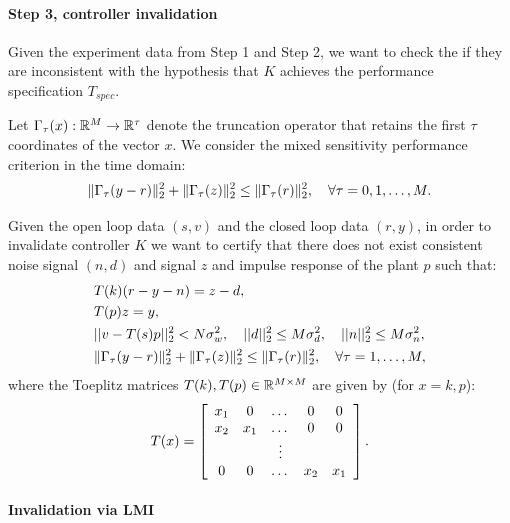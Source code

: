 \documentclass[11pt, onecolumn]{article}
\begin{document}
\paragraph{Step 3, controller invalidation}
Given the experiment data from Step 1 and Step 2, we want to check the if they are inconsistent with
the hypothesis that $K$ achieves the performance specification $T_{spec}$.

Let $\Gamma_{\tau}(x):\mathbb R^{M}\to \mathbb R^{\tau}$ denote the truncation operator that retains the first $\tau$
coordinates of the vector $x$. We consider the mixed sensitivity performance criterion in the time
domain:
\begin{align*}
  \|\Gamma_{\tau}(y-r)\|_2^2 + \|\Gamma_{\tau}(z)\|_2^2 \le \|\Gamma_{\tau}(r)\|_2^2, \quad \forall \tau = 0,1,\dots, M.
\end{align*}

Given the open loop data $(s,v)$ and the closed loop data $(r,y)$, in order to  invalidate controller
$K$ we want to certify that there does not exist consistent noise signal $(n,d)$ and signal $z$ and
impulse response of the plant $p$ such that:
\begin{align}
  & T(k) (r-y - n) = z-d,
  \label{eq:linear-k}
  \\
  & T(p) z = y,
  \label{eq:quad-p}
  \\
  & ||v - T(s)p||_2^2 < N \sigma_w^2, \quad ||d||_2^2\leq M \sigma_d^2 , \quad ||n||_2^2\leq M
  \sigma_n^2,
  \label{eq:noise-bound}
  \\
  & \|\Gamma_{\tau}(y-r)\|_2^2 + \|\Gamma_{\tau}(z)\|_2^2 \le \|\Gamma_{\tau}(r)\|_2^2, \quad \forall
  \tau = 1,\dots, M,
  \label{eq:perf-spec}
\end{align}
where the Toeplitz matrices $T(k), T(p)\in\mathbb R^{M\times M}$  are given by (for $x=k,p$):
\begin{align}
  \label{eq:Tk-Tp}
  T(x) = \left[
    \begin{array}[c]{ccccc}
      x_1 & 0 &\dots & 0  & 0
      \\
      x_2 & x_1 & \dots  & 0  & 0
      \\
      & & \vdots & &
      \\
      0  & 0  & \dots & x_2 & x_1
    \end{array}
\right].
\end{align}


\paragraph{Invalidation via LMI}
\end{document}
